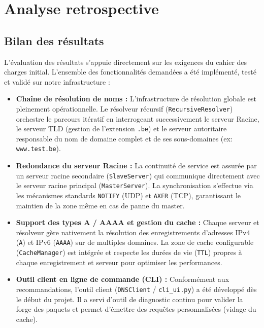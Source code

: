 \section{Analyse retrospective}
\subsection{Bilan des résultats}
L'évaluation des résultats s'appuie directement sur les exigences du cahier des charges initial. L'ensemble des fonctionnalités demandées a été implémenté, testé et validé sur notre infrastructure :

\begin{itemize}
    \item \textbf{Chaîne de résolution de noms :}
    L'infrastructure de résolution globale est pleinement opérationnelle. Le résolveur récursif (\texttt{RecursiveResolver}) orchestre le parcours itératif en interrogeant successivement le serveur Racine, le serveur TLD (gestion de l'extension \texttt{.be}) et le serveur autoritaire responsable du nom de domaine complet et de ses sous-domaines (ex: \texttt{www.test.be}).

    \item \textbf{Redondance du serveur Racine :}
    La continuité de service est assurée par un serveur racine secondaire (\texttt{SlaveServer}) qui communique directement avec le serveur racine principal (\texttt{MasterServer}). La synchronisation s'effectue via les mécanismes standards \texttt{NOTIFY} (UDP) et \texttt{AXFR} (TCP), garantissant le maintien de la zone même en cas de panne du master.

    \item \textbf{Support des types A / AAAA et gestion du cache :}
    Chaque serveur et résolveur gère nativement la résolution des enregistrements d'adresses IPv4 (\texttt{A}) et IPv6 (\texttt{AAAA}) sur de multiples domaines. La zone de cache configurable (\texttt{CacheManager}) est intégrée et respecte les durées de vie (\texttt{TTL}) propres à chaque enregistrement et serveur pour optimiser les performances.

    \item \textbf{Outil client en ligne de commande (CLI) :}
    Conformément aux recommandations, l'outil client (\texttt{DNSClient} / \texttt{cli\_ui.py}) a été développé dès le début du projet. Il a servi d'outil de diagnostic continu pour valider la forge des paquets et permet d'émettre des requêtes personnalisées (vidage du cache).


\end{itemize}
